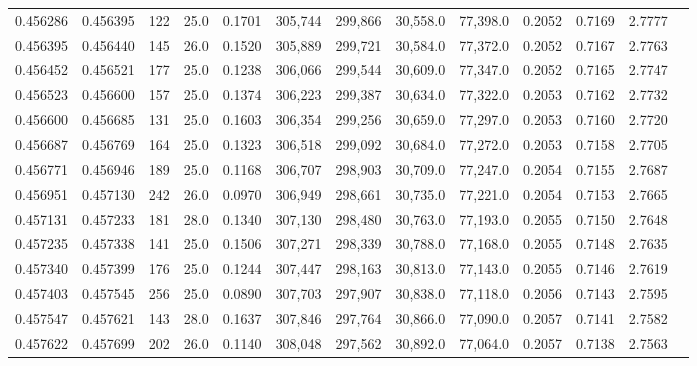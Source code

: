 \begin{tabular}{rrrrrrrrrrrrr}
0.456286 & 0.456395 &   122 & 25.0 &                                     0.1701 & 305,744 & 299,866 &  30,558.0 &  77,398.0 & 0.2052 & 0.7169 & 2.7777 \\
0.456395 & 0.456440 &   145 & 26.0 &                                     0.1520 & 305,889 & 299,721 &  30,584.0 &  77,372.0 & 0.2052 & 0.7167 & 2.7763 \\
0.456452 & 0.456521 &   177 & 25.0 &                                     0.1238 & 306,066 & 299,544 &  30,609.0 &  77,347.0 & 0.2052 & 0.7165 & 2.7747 \\
0.456523 & 0.456600 &   157 & 25.0 &                                     0.1374 & 306,223 & 299,387 &  30,634.0 &  77,322.0 & 0.2053 & 0.7162 & 2.7732 \\
0.456600 & 0.456685 &   131 & 25.0 &                                     0.1603 & 306,354 & 299,256 &  30,659.0 &  77,297.0 & 0.2053 & 0.7160 & 2.7720 \\
0.456687 & 0.456769 &   164 & 25.0 &                                     0.1323 & 306,518 & 299,092 &  30,684.0 &  77,272.0 & 0.2053 & 0.7158 & 2.7705 \\
0.456771 & 0.456946 &   189 & 25.0 &                                     0.1168 & 306,707 & 298,903 &  30,709.0 &  77,247.0 & 0.2054 & 0.7155 & 2.7687 \\
0.456951 & 0.457130 &   242 & 26.0 &                                     0.0970 & 306,949 & 298,661 &  30,735.0 &  77,221.0 & 0.2054 & 0.7153 & 2.7665 \\
0.457131 & 0.457233 &   181 & 28.0 &                                     0.1340 & 307,130 & 298,480 &  30,763.0 &  77,193.0 & 0.2055 & 0.7150 & 2.7648 \\
0.457235 & 0.457338 &   141 & 25.0 &                                     0.1506 & 307,271 & 298,339 &  30,788.0 &  77,168.0 & 0.2055 & 0.7148 & 2.7635 \\
0.457340 & 0.457399 &   176 & 25.0 &                                     0.1244 & 307,447 & 298,163 &  30,813.0 &  77,143.0 & 0.2055 & 0.7146 & 2.7619 \\
0.457403 & 0.457545 &   256 & 25.0 &                                     0.0890 & 307,703 & 297,907 &  30,838.0 &  77,118.0 & 0.2056 & 0.7143 & 2.7595 \\
0.457547 & 0.457621 &   143 & 28.0 &                                     0.1637 & 307,846 & 297,764 &  30,866.0 &  77,090.0 & 0.2057 & 0.7141 & 2.7582 \\
0.457622 & 0.457699 &   202 & 26.0 &                                     0.1140 & 308,048 & 297,562 &  30,892.0 &  77,064.0 & 0.2057 & 0.7138 & 2.7563 \\

\end{tabular}
